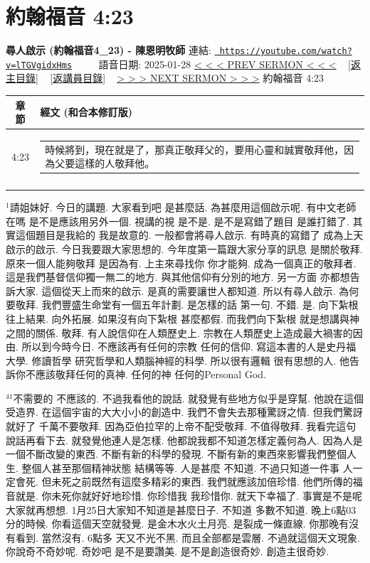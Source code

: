 \documentclass{book}
\begin{document}
\section{約翰福音 4:23}
\label{sec:lTGVgidxHms}
\textbf{尋人啟示 (約翰福音4\_23) - 陳恩明牧師}
\newline
\newline
連結: \href{https://youtube.com/watch?v=lTGVgidxHms}{\texttt{ https://youtube.com/watch?v=lTGVgidxHms}} ~~~~ 語音日期: 2025-01-28 
\newline
\newline
\hyperref[sec:srCkvhUNl9w]{< < < PREV SERMON < < <}
~
\hyperlink{toc}{[返主目錄]}
~
\hyperref[ch:preacher9]{[返講員目錄]}
~
\hyperref[sec:499K9je19EI]{> > > NEXT SERMON > > >}
\newline
\newline
約翰福音 4:23
\newline
\begin{longtable}{cl}
\hline
\hline
章節 & 經文 (和合本修訂版)\\
\hline
4:23 & \begin{tabularx}{0.7\textwidth}{X} 時候將到，現在就是了，那真正敬拜父的，要用心靈和誠實敬拜他，因為父要這樣的人敬拜他。 \end{tabularx} \\ \\
[1ex]
\hline
\hline
\end{longtable}
$^{1}$請姐妹好.
今日的講題.
大家看到吧 是甚麼話.
為甚麼用這個啟示呢.
有中文老師在嗎 是不是應該用另外一個.
視講的視 是不是.
是不是寫錯了題目 是誰打錯了.
其實這個題目是我給的 我是故意的.
一般都會將尋人啟示.
有時真的寫錯了 成為上天啟示的啟示.
今日我要跟大家思想的.
今年度第一篇跟大家分享的訊息 是關於敬拜.
原來一個人能夠敬拜 是因為有.
上主來尋找你 你才能夠.
成為一個真正的敬拜者.
這是我們基督信仰獨一無二的地方.
與其他信仰有分別的地方.
另一方面 亦都想告訴大家.
這個從天上而來的啟示.
是真的需要讓世人都知道.
所以有尋人啟示.
為何要敬拜.
我們豐盛生命堂有一個五年計劃.
是怎樣的話 第一句.
不錯.
是.
向下紮根 往上結果.
向外拓展.
如果沒有向下紮根 甚麼都假.
而我們向下紮根 就是想講與神之間的關係.
敬拜.
有人說信仰在人類歷史上.
宗教在人類歷史上造成最大禍害的因由.
所以到今時今日.
不應該再有任何的宗教 任何的信仰.
寫這本書的人是史丹福大學.
修讀哲學 研究哲學和人類腦神經的科學.
所以很有邏輯 很有思想的人.
他告訴你不應該敬拜任何的真神.
任何的神 任何的Personal God.

$^{41}$不需要的 不應該的.
不過我看他的說話.
就發覺有些地方似乎是穿幫.
他說在這個受造界.
在這個宇宙的大大小小的創造中.
我們不會失去那種驚訝之情.
但我們驚訝就好了 千萬不要敬拜.
因為亞伯拉罕的上帝不配受敬拜.
不值得敬拜.
我看完這句說話再看下去.
就發覺他連人是怎樣.
他都說我都不知道怎樣定義何為人.
因為人是一個不斷改變的東西.
不斷有新的科學的發現.
不斷有新的東西來影響我們整個人生.
整個人甚至那個精神狀態 結構等等.
人是甚麼 不知道.
不過只知道一件事 人一定會死.
但未死之前既然有這麼多精彩的東西.
我們就應該加倍珍惜.
他們所傳的福音就是.
你未死你就好好地珍惜.
你珍惜我 我珍惜你.
就天下幸福了.
事實是不是呢 大家就再想想.
1月25日大家知不知道是甚麼日子.
不知道 多數不知道.
晚上6點03分的時候.
你看這個天空就發覺.
是金木水火土月亮.
是裂成一條直線.
你那晚有沒有看到.
當然沒有.
6點多 天又不光不黑.
而且全部都是雲層.
不過就這個天文現象.
你說奇不奇妙呢.
奇妙吧 是不是要讚美.
是不是創造很奇妙.
創造主很奇妙.
\end{document}
